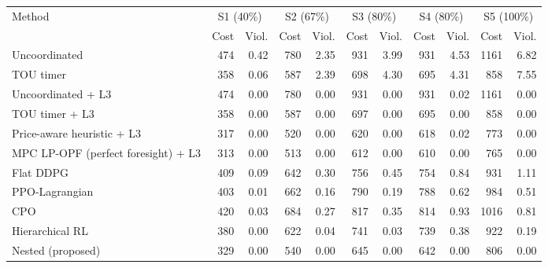 \begin{tabular}{@{}lrrrrrrrrrr@{}}
\toprule
Method & \multicolumn{2}{c}{S1 (40\%)} & \multicolumn{2}{c}{S2 (67\%)} & \multicolumn{2}{c}{S3 (80\%)} & \multicolumn{2}{c}{S4 (80\%)} & \multicolumn{2}{c}{S5 (100\%)} \\
 & Cost & Viol. & Cost & Viol. & Cost & Viol. & Cost & Viol. & Cost & Viol. \\
\midrule
Uncoordinated & 474 & 0.42 & 780 & 2.35 & 931 & 3.99 & 931 & 4.53 & 1161 & 6.82 \\
TOU timer & 358 & 0.06 & 587 & 2.39 & 698 & 4.30 & 695 & 4.31 & 858 & 7.55 \\
Uncoordinated + L3 & 474 & 0.00 & 780 & 0.00 & 931 & 0.00 & 931 & 0.02 & 1161 & 0.00 \\
TOU timer + L3 & 358 & 0.00 & 587 & 0.00 & 697 & 0.00 & 695 & 0.00 & 858 & 0.00 \\
Price-aware heuristic + L3 & 317 & 0.00 & 520 & 0.00 & 620 & 0.00 & 618 & 0.02 & 773 & 0.00 \\
MPC LP-OPF (perfect foresight) + L3 & 313 & 0.00 & 513 & 0.00 & 612 & 0.00 & 610 & 0.00 & 765 & 0.00 \\
Flat DDPG & 409 & 0.09 & 642 & 0.30 & 756 & 0.45 & 754 & 0.84 & 931 & 1.11 \\
PPO-Lagrangian & 403 & 0.01 & 662 & 0.16 & 790 & 0.19 & 788 & 0.62 & 984 & 0.51 \\
CPO & 420 & 0.03 & 684 & 0.27 & 817 & 0.35 & 814 & 0.93 & 1016 & 0.81 \\
Hierarchical RL & 380 & 0.00 & 622 & 0.04 & 741 & 0.03 & 739 & 0.38 & 922 & 0.19 \\
Nested (proposed) & 329 & 0.00 & 540 & 0.00 & 645 & 0.00 & 642 & 0.00 & 806 & 0.00 \\
\bottomrule
\end{tabular}
